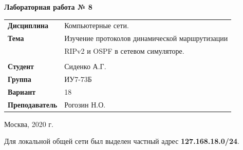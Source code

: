 \documentclass[a4paper,14pt]{extreport} %
\begin{document}
\begin{titlepage}
    \vspace{2cm}

    \begin{center}
        \textbf{Лабораторная работа № 8} \\
        \vspace{0.5cm}
    \end{center}

    \vspace{4cm}

    \begin{flushleft}
        \begin{tabular}{ll}
            \textbf{Дисциплина} & Компьютерные сети.  \\
            \textbf{Тема} & Изучение протоколов динамической маршрутизации  \\
            & RIPv2 и OSPF в сетевом симуляторе.  \\
            \\
            \textbf{Студент} & Сиденко А.Г. \\
            \textbf{Группа} & ИУ7-73Б \\
            \textbf{Вариант} & 18\\
            \textbf{Преподаватель} & Рогозин Н.О.  \\
        \end{tabular}
    \end{flushleft}

    \vspace{4cm}

   \begin{center}
        Москва, 2020 г.
    \end{center}

\end{titlepage}

Для локальной общей сети был выделен частный адрес \textbf{127.168.18.0/24}. 
\end{document}
